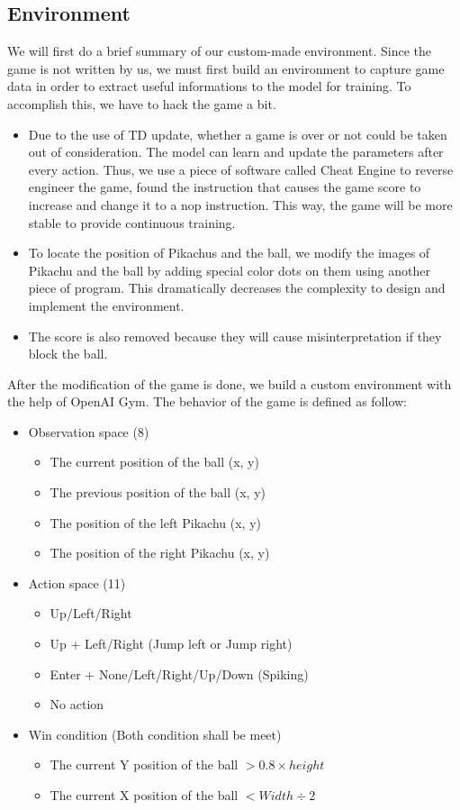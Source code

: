 \documentclass[sigconf]{acmart}
\begin{document}
\subsection{Environment}
We will first do a brief summary of our custom-made environment. Since the game is not written by us, we must first build an environment to capture game data in order to extract useful informations to the model for training. To accomplish this, we have to hack the game a bit.
\begin{itemize}
  \item Due to the use of TD update, whether a game is over or not could be taken out of consideration. The model can learn and update the parameters after every action. Thus, we use a piece of software called Cheat Engine to reverse engineer the game, found the instruction that causes the game score to increase and change it to a nop instruction. This way, the game will be more stable to provide continuous training.
  \item To locate the position of Pikachus and the ball, we modify the images of Pikachu and the ball by adding special color dots on them using another piece of program. This dramatically decreases the complexity to design and implement the environment.
  \item The score is also removed because they will cause misinterpretation if they block the ball.
\end{itemize}
After the modification of the game is done, we build a custom environment with the help of OpenAI Gym. The behavior of the game is defined as follow:
\begin{itemize}
  \item Observation space (8)
     \begin{itemize} 
        \item The current position of the ball (x, y)
        \item The previous position of the ball (x, y)
        \item The position of the left Pikachu (x, y)
        \item The position of the right Pikachu (x, y)
     \end{itemize}
\item Action space (11)
  \begin{itemize} 
    \item Up/Left/Right
    \item Up + Left/Right (Jump left or Jump right)
    \item Enter + None/Left/Right/Up/Down (Spiking)
    \item No action
  \end{itemize}
\item Win condition (Both condition shall be meet)
  \begin{itemize} 
    \item The current Y position of the ball $ > 0.8 \times height$
    \item The current X position of the ball $ < Width \div 2$
  \end{itemize}
\end{itemize}
\end{document}
